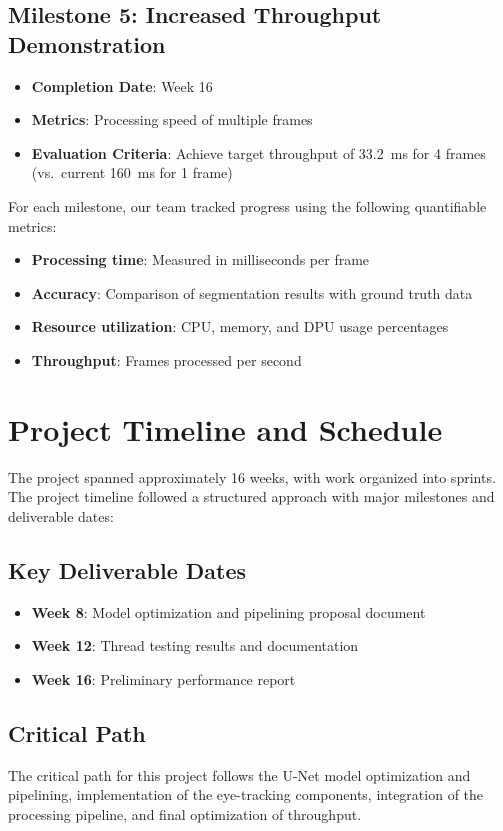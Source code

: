 \subsection{Milestone 5: Increased Throughput Demonstration}
\begin{itemize}
\item \textbf{Completion Date}: Week 16
\item \textbf{Metrics}: Processing speed of multiple frames
\item \textbf{Evaluation Criteria}: Achieve target throughput of 33.2\ ms for 4 frames (vs.\ current 160\ ms for 1 frame)
\end{itemize}

For each milestone, our team tracked progress using the following quantifiable metrics:

\begin{itemize}
\item \textbf{Processing time}: Measured in milliseconds per frame
\item \textbf{Accuracy}: Comparison of segmentation results with ground truth data
\item \textbf{Resource utilization}: CPU, memory, and DPU usage percentages
\item \textbf{Throughput}: Frames processed per second
\end{itemize}

\section{Project Timeline and Schedule}\label{sec:timeline}

The project spanned approximately 16 weeks, with work organized into sprints. The project timeline followed a structured approach with major milestones and deliverable dates:

\subsection{Key Deliverable Dates}
\begin{itemize}
\item \textbf{Week 8}: Model optimization and pipelining proposal document
\item \textbf{Week 12}: Thread testing results and documentation
\item \textbf{Week 16}: Preliminary performance report
\end{itemize}

\subsection{Critical Path}
The critical path for this project follows the U-Net model optimization and pipelining, implementation of the eye-tracking components, integration of the processing pipeline, and final optimization of throughput.

